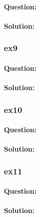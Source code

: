 \documentclass[a4paper,12pt,titlepage]{article} %
\begin{document}
\paragraph{Question:}

\paragraph{Solution:}

\subsubsection{ex9}
\paragraph{Question:}

\paragraph{Solution:}

\subsubsection{ex10}
\paragraph{Question:}

\paragraph{Solution:}

\subsubsection{ex11}
\paragraph{Question:}

\paragraph{Solution:}


\newpage
\listoftables

\newpage
\listoffigures

\end{document}
